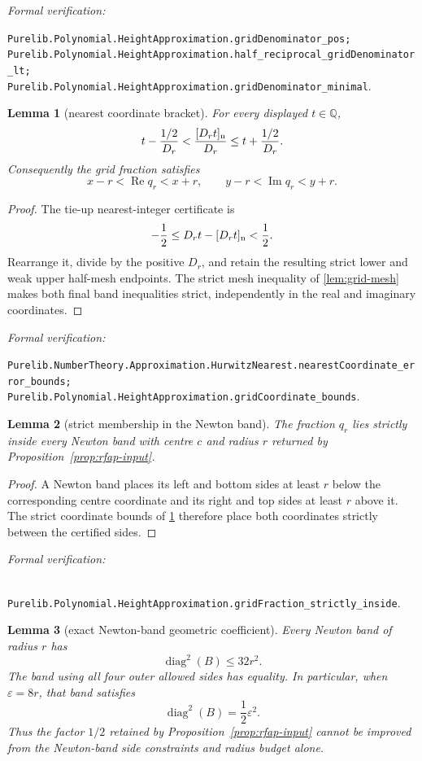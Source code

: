 \documentclass[11pt]{article}
\newtheorem{lemma}[lemma]{Lemma}
\newcommand{\Q}{\mathbb{Q}}
\newcommand{\Ree}{\operatorname{Re}}
\newcommand{\Imm}{\operatorname{Im}}
\newcommand{\diamq}{\operatorname{diag}^{2}}
\newcommand{\eps}{\varepsilon}
\newcommand{\leanref}[1]{\par\smallskip\noindent
  \emph{Formal verification:}\par\nobreak
  {\raggedright\nolinkurl{#1}.\par}}
\begin{document}
\leanref{Purelib.Polynomial.HeightApproximation.gridDenominator_pos;
Purelib.Polynomial.HeightApproximation.half_reciprocal_gridDenominator_lt;
Purelib.Polynomial.HeightApproximation.gridDenominator_minimal}

\begin{lemma}[nearest coordinate bracket]
\label{lem:grid-coordinate}
For every displayed $t\in\Q$,
\[
 t-\frac{1/2}{D_r}
 <\frac{[D_rt]_{\rm n}}{D_r}
 \le t+\frac{1/2}{D_r}.
\]
Consequently the grid fraction satisfies
\[
 x-r<\Ree q_r<x+r,
 \qquad
 y-r<\Imm q_r<y+r.
\]
\end{lemma}

\begin{proof}
The tie-up nearest-integer certificate is
\[
               -\frac12\le D_rt-[D_rt]_{\rm n}<\frac12.
\]
Rearrange it, divide by the positive $D_r$, and retain the resulting strict
lower and weak upper half-mesh endpoints.  The strict mesh inequality of
\cref{lem:grid-mesh} makes both final band inequalities strict, independently
in the real and imaginary coordinates.
\end{proof}

\leanref{Purelib.NumberTheory.Approximation.HurwitzNearest.nearestCoordinate_error_bounds;
Purelib.Polynomial.HeightApproximation.gridCoordinate_bounds}

\begin{lemma}[strict membership in the Newton band]
\label{lem:grid}
The fraction $q_r$ lies strictly inside every Newton band with centre $c$ and
radius $r$ returned by Proposition~\ref{prop:rfap-input}.
\end{lemma}

\begin{proof}
A Newton band places its left and bottom sides at least $r$ below the
corresponding centre coordinate and its right and top sides at least $r$
above it.  The strict coordinate bounds of \cref{lem:grid-coordinate}
therefore place both coordinates strictly between the certified sides.
\end{proof}

\leanref{
Purelib.Polynomial.HeightApproximation.gridFraction_strictly_inside}

\begin{lemma}[exact Newton-band geometric coefficient]
\label{lem:newton-band-half-sharp}
Every Newton band of radius $r$ has
\[
                         \diamq(B)\le32r^2.
\]
The band using all four outer allowed sides has equality.  In particular,
when $\eps=8r$, that band satisfies
\begin{equation}
\label{eq:newton-band-half-sharp}
                         \diamq(B)=\frac12\eps^2.
\end{equation}
Thus the factor $1/2$ retained by Proposition~\ref{prop:rfap-input} cannot be
improved from the Newton-band side constraints and radius budget alone.
\end{lemma}
\end{document}
